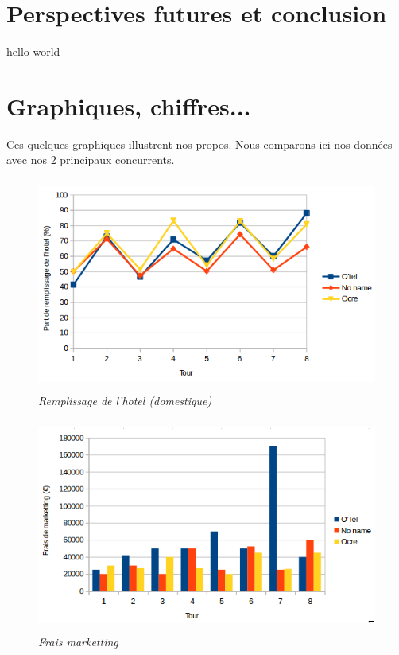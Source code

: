 \documentclass[a4paper,10pt]{article}
\begin{document}
  \newpage
  \section{Perspectives futures et conclusion}
    hello world
    
  \newpage
  \section{Graphiques, chiffres...}
    Ces quelques graphiques illustrent nos propos. Nous comparons ici nos données avec nos 2 principaux concurrents.
    \newline
        
    \begin{figure}[!ht]
      \begin{center}
	\includegraphics[height=7cm,keepaspectratio]{./images/remplissage_hotel.png}
      \end{center}
      \caption{\textit{Remplissage de l'hotel (domestique)}}
    \end{figure}
    
    \begin{figure}[!ht]
      \begin{center}
	\includegraphics[height=7cm,keepaspectratio]{./images/frais_marketting.png}
      \end{center}
      \caption{\textit{Frais marketting}}
    \end{figure}
    
\end{document}

